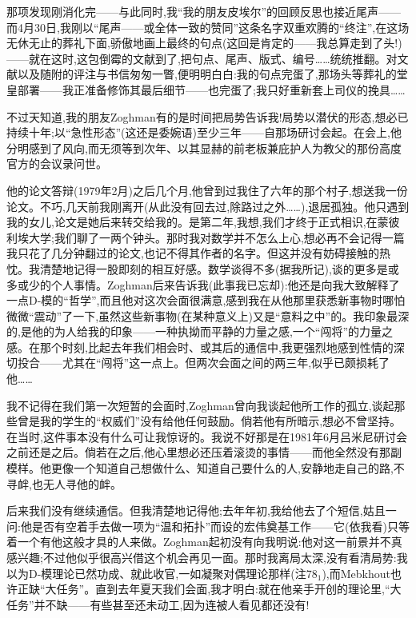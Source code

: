 那项发现刚消化完——与此同时,我“我的朋友皮埃尔”的回顾反思也接近尾声——而4月30日,我刚以“尾声——或全体一致的赞同”这条名字双重欢腾的“终注”,在这场无休无止的葬礼下面,骄傲地画上最终的句点(这回是肯定的——我总算走到了头!)——就在这时,这包倒霉的文献到了,把句点、尾声、版式、编号……统统推翻。对文献以及随附的评注与书信匆匆一瞥,便明明白白:我的句点完蛋了,那场头等葬礼的堂皇部署——我正准备修饰其最后细节——也完蛋了;我只好重新套上司仪的挽具……

不过天知道,我的朋友Zoghman有的是时间把局势告诉我!局势以潜伏的形态,想必已持续十年;以“急性形态”(这还是委婉语)至少三年——自那场研讨会起。在会上,他分明感到了风向,而无须等到次年、以其显赫的前老板兼庇护人为教父的那份高度官方的会议录问世。

他的论文答辩(1979年2月)之后几个月,他曾到过我住了六年的那个村子,想送我一份论文。不巧,几天前我刚离开(从此没有回去过,除路过之外……),退居孤独。他只遇到我的女儿,论文是她后来转交给我的。是第二年,我想\dmark{},我们才终于正式相识,在蒙彼利埃大学;我们聊了一两个钟头。那时我对数学并不怎么上心,想必再不会记得一篇我只花了几分钟翻过的论文,也记不得其作者的名字。但这并没有妨碍接触的热忱。我清楚地记得一股即刻的相互好感。数学谈得不多(据我所记),谈的更多是或多或少的个人事情。Zoghman后来告诉我(此事我已忘却):他还是向我大致解释了一点D-模的“哲学”,而且他对这次会面很满意,感到我在从他那里获悉新事物时哪怕微微“震动”了一下,虽然这些新事物(在某种意义上)又是“意料之中”的。我印象最深的,是他的为人给我的印象——一种执拗而平静的力量之感,一个“闯将”的力量之感。在那个时刻,比起去年我们相会时、或其后的通信中,我更强烈地感到性情的深切投合——尤其在“闯将”这一点上。但两次会面之间的两三年,似乎已颇损耗了他……

我不记得在我们第一次短暂的会面时,Zoghman曾向我谈起他所工作的孤立,谈起那些曾是我的学生的“权威们”没有给他任何鼓励。倘若他有所暗示,想必不曾坚持。在当时,这件事本没有什么可让我惊讶的。我说不好那是在1981年6月吕米尼研讨会之前还是之后。倘若在之后,他心里想必还压着滚烫的事情——而他全然没有那副模样。他更像一个知道自己想做什么、知道自己要什么的人,安静地走自己的路,不寻衅,也无人寻他的衅。

\dmark{}后来我们没有继续通信。但我清楚地记得他;去年年初,我给他去了个短信,姑且一问:他是否有空着手去做一项为“温和拓扑”而设的宏伟奠基工作——它(依我看)只等着一个有他这般才具的人来做。Zoghman起初没有向我明说:他对这一前景并不真感兴趣;不过他似乎很高兴借这个机会再见一面。那时我离局太深,没有看清局势:我以为D-模理论已然功成、就此收官,一如凝聚对偶理论那样(注78$_{1}$),而Mebkhout也许正缺“大任务”。直到去年夏天我们会面,我才明白:就在他亲手开创的理论里,“大任务”并不缺——有些甚至还未动工,因为连被人看见都还没有!

